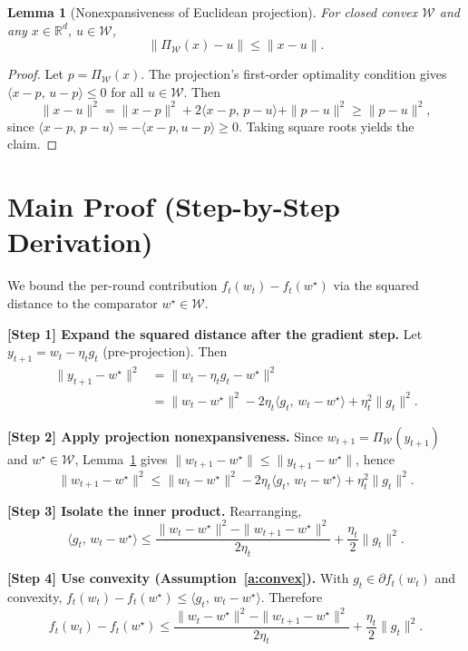 \documentclass[11pt]{article}
\newtheorem{lemma}{Lemma}
\begin{document}
\begin{lemma}[Nonexpansiveness of Euclidean projection]\label{lem:proj}
For closed convex $\mathcal{W}$ and any $x\in\mathbb{R}^d$, $u\in\mathcal{W}$,
\[
\|\Pi_{\mathcal{W}}(x) - u\| \le \|x - u\|.
\]
\end{lemma}

\begin{proof}
Let $p=\Pi_{\mathcal{W}}(x)$. The projection's first-order optimality condition gives
$\langle x - p,\, u - p\rangle \le 0$ for all $u\in\mathcal{W}$. Then
\[
\|x-u\|^2 = \|x-p\|^2 + 2\langle x-p,\,p-u\rangle + \|p-u\|^2
\ge \|p-u\|^2,
\]
since $\langle x-p,\,p-u\rangle = -\langle x-p, u-p\rangle \ge 0$. Taking square roots
yields the claim.
\end{proof}

\section*{Main Proof (Step-by-Step Derivation)}

We bound the per-round contribution $f_t(w_t) - f_t(w^\star)$ via the squared distance to
the comparator $w^\star\in\mathcal{W}$.

\textbf{[Step 1] Expand the squared distance after the gradient step.}
Let $y_{t+1} = w_t - \eta_t g_t$ (pre-projection). Then
\begin{align*}
\|y_{t+1} - w^\star\|^2
&= \|w_t - \eta_t g_t - w^\star\|^2 \\
&= \|w_t - w^\star\|^2 - 2\eta_t \langle g_t,\, w_t - w^\star\rangle
   + \eta_t^2 \|g_t\|^2.
\end{align*}

\textbf{[Step 2] Apply projection nonexpansiveness.}
Since $w_{t+1} = \Pi_{\mathcal{W}}(y_{t+1})$ and $w^\star\in\mathcal{W}$,
Lemma~\ref{lem:proj} gives $\|w_{t+1}-w^\star\| \le \|y_{t+1}-w^\star\|$, hence
\[
\|w_{t+1} - w^\star\|^2
\le \|w_t - w^\star\|^2 - 2\eta_t \langle g_t,\, w_t - w^\star\rangle
   + \eta_t^2 \|g_t\|^2.
\]

\textbf{[Step 3] Isolate the inner product.}
Rearranging,
\[
\langle g_t,\, w_t - w^\star\rangle
\le \frac{\|w_t - w^\star\|^2 - \|w_{t+1} - w^\star\|^2}{2\eta_t}
   + \frac{\eta_t}{2}\|g_t\|^2.
\]

\textbf{[Step 4] Use convexity (Assumption~\ref{a:convex}).}
With $g_t\in\partial f_t(w_t)$ and convexity,
$f_t(w_t) - f_t(w^\star) \le \langle g_t,\, w_t - w^\star\rangle$. Therefore
\[
f_t(w_t) - f_t(w^\star)
\le \frac{\|w_t - w^\star\|^2 - \|w_{t+1} - w^\star\|^2}{2\eta_t}
   + \frac{\eta_t}{2}\|g_t\|^2.
\]
\end{document}

